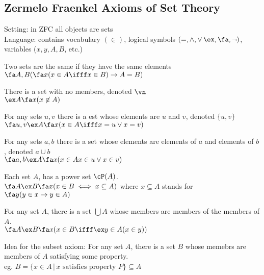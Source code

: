 \subsection{Zermelo Fraenkel Axioms of Set Theory}

Setting: in ZFC all objects are sets \\
Language: contains vocabulary $(\in)$, logical symbols $(=, \wedge, \vee\, \ex, \fa, \neg)$, variables ($x, y, A, B$, etc.)

\begin{axiom}
    Two sets are the same if they have the same elements \\
    $\fa A , B(\fa x (x \in A \ifff x \in B) \to A = B)$
\end{axiom}

\begin{axiom}
    There is a set with no members, denoted $\vn$ \\
    $\ex A \fa x (x \not\in A)$
\end{axiom}

\begin{axiom}
    For any sets $u,v$ there is a est whose elements are $u$ and $v$, denoted $\{u, v\}$ \\
    $\fa u, v \ex A \fa x (x \in A \ifff x = u \vee x = v)$
\end{axiom}

\begin{axiom}
    For any sets $a,b$ there is a set whose elements are elements of $a$ and elements of $b$, denoted $a \cup b$ \\
    $\fa a, b \ex A \fa x (x \in A x \in u \vee x \in v)$
\end{axiom}

\begin{axiom}
    Each set $A$, has a power set $\cP(A)$. \\
    $\fa A \ex B \fa x(x \in B \iff x \subseteq A)$ \quad where $x \subseteq A$ stands for $\fa y (y \in x \to y \in A)$
\end{axiom} 

\begin{axiom}
    For any set $A$, there is a set $\bigcup A$ whose members are members of the members of $A$. \\
    $\fa A \ex B \fa x (x \in B \ifff \ex y \in A (x \in y))$
\end{axiom}

\noindent 
Idea for the subset axiom: For any set $A$, there is a set $B$ whose memebrs are members of $A$ satisfying some property. \\
eg. $B = \{ x\in A \, | \, x \text{ satisfies property } P \} \subseteq A$ 

